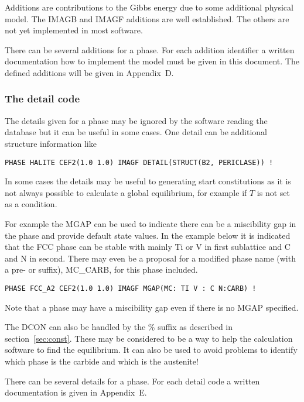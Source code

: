 \documentclass[12pt]{article}
\begin{document}
Additions are contributions to the Gibbs energy due to some additional
physical model.  The IMAGB and IMAGF additions are well established.
The others are not yet implemented in most software.

There can be several additions for a phase.  For each addition
identifier a written documentation how to implement the model must be
given in this document.  The defined additions will be given in
Appendix~D.

\subsubsection{The detail code}\label{sec:detail}

The details given for a phase may be ignored by the software
reading the database but it can be useful in some cases.  One
detail can be additional structure information like

\begin{verbatim}
PHASE HALITE CEF2(1.0 1.0) IMAGF DETAIL(STRUCT(B2, PERICLASE)) !
\end{verbatim}

In some cases the details may be useful to generating start
constitutions as it is not always possible to calculate a global
equilibrium, for example if $T$ is not set as a condition.

For example the MGAP can be used to indicate there can be a
miscibility gap in the phase and provide default state values.  In the
example below it is indicated that the FCC phase can be stable with
mainly Ti or V in first sublattice and C and N in second.  There may
even be a proposal for a modified phase name (with a pre- or suffix),
MC\_CARB, for this phase included.

\begin{verbatim}
PHASE FCC_A2 CEF2(1.0 1.0) IMAGF MGAP(MC: TI V : C N:CARB) !
\end{verbatim}

Note that a phase may have a miscibility gap even if there is no MGAP
specified.

The DCON can also be handled by the \% suffix as described in
section~\ref{sec:const}.  These may be considered to be a way to help
the calculation software to find the equilibrium.  It can also be used
to avoid problems to identify which phase is the carbide and which is
the austenite!

There can be several details for a phase.  For each detail code a
written documentation is given in Appendix~E.
\end{document}
